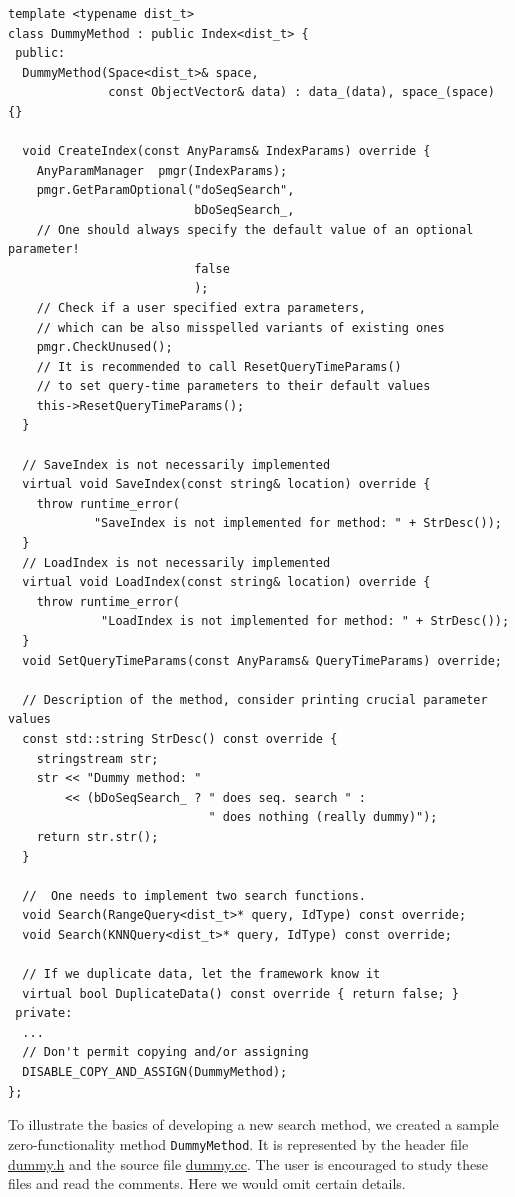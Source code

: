 \documentclass[runningheads,a4paper]{llncs}
\newcommand{\replocfile}{https://github.com/searchivarius/NonMetricSpaceLib/blob/pserv/}
\newcommand{\ttt}[1]{\texttt{#1}}
\begin{document}
\begin{table}[[!htbp]
\caption{\label{FigDummyMethod}A sample search method class}
\begin{verbatim}
template <typename dist_t>
class DummyMethod : public Index<dist_t> {
 public:
  DummyMethod(Space<dist_t>& space, 
              const ObjectVector& data) : data_(data), space_(space) {}

  void CreateIndex(const AnyParams& IndexParams) override {
    AnyParamManager  pmgr(IndexParams);
    pmgr.GetParamOptional("doSeqSearch",  
                          bDoSeqSearch_, 
    // One should always specify the default value of an optional parameter!
                          false
                          );
    // Check if a user specified extra parameters, 
    // which can be also misspelled variants of existing ones
    pmgr.CheckUnused();
    // It is recommended to call ResetQueryTimeParams() 
    // to set query-time parameters to their default values
    this->ResetQueryTimeParams();
  }

  // SaveIndex is not necessarily implemented
  virtual void SaveIndex(const string& location) override {
    throw runtime_error(
            "SaveIndex is not implemented for method: " + StrDesc());
  }
  // LoadIndex is not necessarily implemented
  virtual void LoadIndex(const string& location) override {
    throw runtime_error(
             "LoadIndex is not implemented for method: " + StrDesc());
  }
  void SetQueryTimeParams(const AnyParams& QueryTimeParams) override;

  // Description of the method, consider printing crucial parameter values
  const std::string StrDesc() const override { 
    stringstream str;
    str << "Dummy method: " 
        << (bDoSeqSearch_ ? " does seq. search " : 
                            " does nothing (really dummy)"); 
    return str.str();
  }

  //  One needs to implement two search functions.
  void Search(RangeQuery<dist_t>* query, IdType) const override;
  void Search(KNNQuery<dist_t>* query, IdType) const override;

  // If we duplicate data, let the framework know it
  virtual bool DuplicateData() const override { return false; }
 private:
  ...
  // Don't permit copying and/or assigning 
  DISABLE_COPY_AND_ASSIGN(DummyMethod);
};
\end{verbatim}
\end{table}

To illustrate the basics of developing a new search method,
we created a sample zero-functionality method \ttt{DummyMethod}.
It is represented by 
the header file 
\href{\replocfile similarity_search/include/method/dummy.h}{dummy.h}
and the source file
\href{\replocfile similarity_search/src/method/dummy.cc}{dummy.cc}.
The user is encouraged to study these files and read the comments.
Here we would omit certain details.
\end{document}
